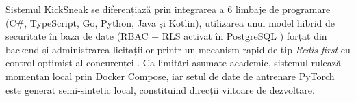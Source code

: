 Sistemul KickSneak se diferențiază prin integrarea a 6 limbaje de programare (C\#, TypeScript, Go, Python, Java și Kotlin), utilizarea unui model hibrid de securitate în baza de date (RBAC + RLS activat în PostgreSQL \cite{postgresql2026rls}) forțat din backend și administrarea licitațiilor printr-un mecanism rapid de tip \textit{Redis-first} cu control optimist al concurenței \cite{redis2026watch}. Ca limitări asumate academic, sistemul rulează momentan local prin Docker Compose, iar setul de date de antrenare PyTorch este generat semi-sintetic local, constituind direcții viitoare de dezvoltare.
